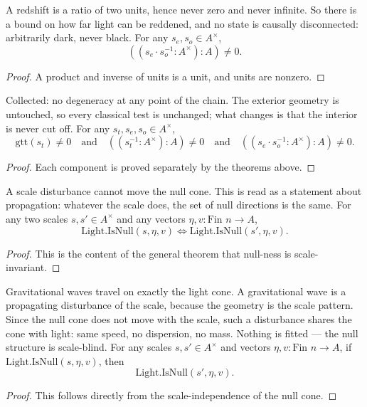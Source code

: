 \begin{theorem}
A redshift is a ratio of two units, hence never zero and never infinite. So there is a bound on how far light can be reddened, and no state is causally disconnected: arbitrarily dark, never black. For any $s_e, s_o \in A^\times$,
\[
((s_e \cdot s_o^{-1} : A^\times) : A) \neq 0.
\]
\begin{proof}
A product and inverse of units is a unit, and units are nonzero.
\end{proof}
\end{theorem}

\begin{theorem}
Collected: no degeneracy at any point of the chain. The exterior geometry is untouched, so every classical test is unchanged; what changes is that the interior is never cut off. For any $s_t, s_e, s_o \in A^\times$,
\[
\text{gtt}(s_t) \neq 0 \quad \text{and} \quad ((s_t^{-1} : A^\times) : A) \neq 0 \quad \text{and} \quad ((s_e \cdot s_o^{-1} : A^\times) : A) \neq 0.
\]
\begin{proof}
Each component is proved separately by the theorems above.
\end{proof}
\end{theorem}

\begin{theorem}
A scale disturbance cannot move the null cone. This is read as a statement about propagation: whatever the scale does, the set of null directions is the same. For any two scales $s, s' \in A^\times$ and any vectors $\eta, v : \text{Fin } n \to A$,
\[
\text{Light.IsNull}(s, \eta, v) \iff \text{Light.IsNull}(s', \eta, v).
\]
\begin{proof}
This is the content of the general theorem that null-ness is scale-invariant.
\end{proof}
\end{theorem}

\begin{theorem}
Gravitational waves travel on exactly the light cone. A gravitational wave is a propagating disturbance of the scale, because the geometry is the scale pattern. Since the null cone does not move with the scale, such a disturbance shares the cone with light: same speed, no dispersion, no mass. Nothing is fitted — the null structure is scale-blind. For any scales $s, s' \in A^\times$ and vectors $\eta, v : \text{Fin } n \to A$, if $\text{Light.IsNull}(s, \eta, v)$, then
\[
\text{Light.IsNull}(s', \eta, v).
\]
\begin{proof}
This follows directly from the scale-independence of the null cone.
\end{proof}
\end{theorem}

